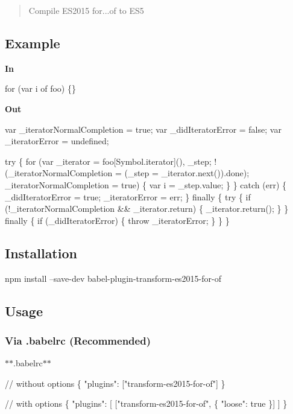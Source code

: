 \begin{quote}
Compile E\+S2015 for...of to E\+S5 \end{quote}


\subsection*{Example}

{\bfseries In}


\begin{DoxyCode}
for (var i of foo) \{\}
\end{DoxyCode}


{\bfseries Out}


\begin{DoxyCode}
var \_iteratorNormalCompletion = true;
var \_didIteratorError = false;
var \_iteratorError = undefined;

try \{
  for (var \_iterator = foo[Symbol.iterator](), \_step; !(\_iteratorNormalCompletion = (\_step =
       \_iterator.next()).done); \_iteratorNormalCompletion = true) \{
    var i = \_step.value;
  \}
\} catch (err) \{
  \_didIteratorError = true;
  \_iteratorError = err;
\} finally \{
  try \{
    if (!\_iteratorNormalCompletion && \_iterator.return) \{
      \_iterator.return();
    \}
  \} finally \{
    if (\_didIteratorError) \{
      throw \_iteratorError;
    \}
  \}
\}
\end{DoxyCode}


\subsection*{Installation}


\begin{DoxyCode}
npm install --save-dev babel-plugin-transform-es2015-for-of
\end{DoxyCode}


\subsection*{Usage}

\subsubsection*{Via {\ttfamily .babelrc} (Recommended)}

$\ast$$\ast$.babelrc$\ast$$\ast$


\begin{DoxyCode}
// without options
\{
  "plugins": ["transform-es2015-for-of"]
\}

// with options
\{
  "plugins": [
    ["transform-es2015-for-of", \{
      "loose": true
    \}]
  ]
\}
\end{DoxyCode}


